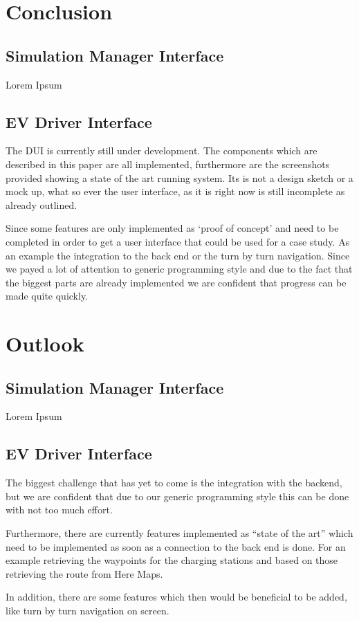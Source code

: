 \section{Conclusion}

\subsection{Simulation Manager Interface}

Lorem Ipsum

\subsection{EV Driver Interface}

The DUI is currently still under development. The components which are described in this paper are all implemented, furthermore are the screenshots provided showing a state of the art running system. Its is not a design sketch or a mock up, what so ever the user interface, as it is right now is still incomplete as already outlined.

Since some features are only implemented as ‘proof of concept’ and need to be completed in order to get a user interface that could be used for a case study. As an example the integration to the back end or the turn by turn navigation. Since we payed a lot of attention to generic programming style and due to the fact that the biggest parts are already implemented we are confident that progress can be made quite quickly.


\section{Outlook}

\subsection{Simulation Manager Interface}

Lorem Ipsum

\subsection{EV Driver Interface}

The biggest challenge that has yet to come is the integration with the backend, but we are confident that due to our generic programming style this can be done with not too much effort.

Furthermore, there are currently features implemented as ``state of the art'' which need to be implemented as soon as a connection to the back end is done. For an example retrieving the waypoints for the charging stations and based on those retrieving the route from Here Maps.

In addition, there are some features which then would be beneficial to be added, like turn by turn navigation on screen.
